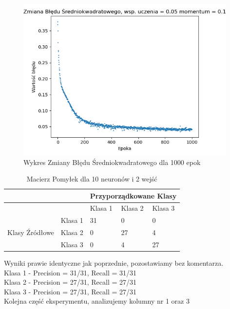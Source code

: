 \documentclass[12pt]{article}
\begin{document}
\begin{figure}[!ht]
 \centering
 \includegraphics[width=11cm]{WykresBlad10neuron2wejscia3.png}
 \caption{Wykres Zmiany Błędu Średniokwadratowego dla 1000 epok}
 \vspace{-0.1cm}
 \label{WykresBlad13}
\end{figure}


\newpage
\begin{table}
\caption{\label{tab:tablica12} Macierz Pomyłek dla 10 neuronów i 2 wejść}
\begin{tabular}{ |p{3cm}|p{3cm}|p{2cm}|p{2cm}|p{2cm}|  }
 \hline
 & & 
 \multicolumn{3}{|c|}{Przyporządkowane Klasy} \\
 \hline

   & & Klasa 1 & Klasa 2 & Klasa 3\\
 \hline
\multirow{3}{4em}{Klasy Źródłowe}
   & Klasa 1 & 31 & 0 & 0 \\ 
   & Klasa 2 & 0  & 27 & 4 \\
   & Klasa 3 & 0  & 4   & 27 \\
 \hline
\end{tabular}
\end{table}
Wyniki prawie identyczne jak poprzednie, pozostawiamy bez komentarza.
\\Klasa 1 - Precision = 31/31, Recall = 31/31\\
Klasa 2 - Precision = 27/31, Recall = 27/31\\
Klasa 3 - Precision = 27/31, Recall = 27/31\\
\newline
Kolejna część eksperymentu, analizujemy kolumny nr 1 oraz 3
\end{document}
